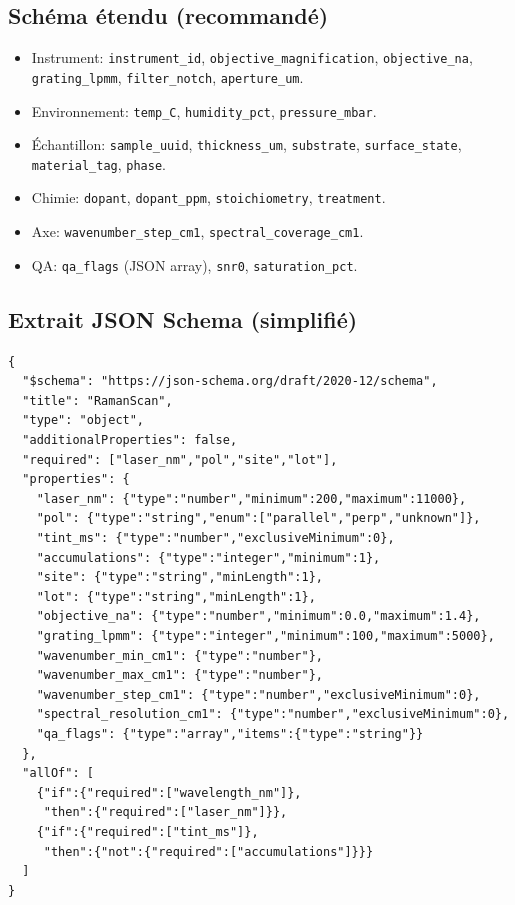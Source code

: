 \subsection{Schéma étendu (recommandé)}
\begin{itemize}[nosep]
\item Instrument: \texttt{instrument\_id}, \texttt{objective\_magnification}, \texttt{objective\_na}, \texttt{grating\_lpmm}, \texttt{filter\_notch}, \texttt{aperture\_um}.
\item Environnement: \texttt{temp\_C}, \texttt{humidity\_pct}, \texttt{pressure\_mbar}.
\item Échantillon: \texttt{sample\_uuid}, \texttt{thickness\_um}, \texttt{substrate}, \texttt{surface\_state}, \texttt{material\_tag}, \texttt{phase}.
\item Chimie: \texttt{dopant}, \texttt{dopant\_ppm}, \texttt{stoichiometry}, \texttt{treatment}.
\item Axe: \texttt{wavenumber\_step\_cm1}, \texttt{spectral\_coverage\_cm1}.
\item QA: \texttt{qa\_flags} (JSON array), \texttt{snr0}, \texttt{saturation\_pct}.
\end{itemize}

\subsection{Extrait JSON Schema (simplifié)}
\begin{lstlisting}[basicstyle=\ttfamily\small]
{
  "$schema": "https://json-schema.org/draft/2020-12/schema",
  "title": "RamanScan",
  "type": "object",
  "additionalProperties": false,
  "required": ["laser_nm","pol","site","lot"],
  "properties": {
    "laser_nm": {"type":"number","minimum":200,"maximum":11000},
    "pol": {"type":"string","enum":["parallel","perp","unknown"]},
    "tint_ms": {"type":"number","exclusiveMinimum":0},
    "accumulations": {"type":"integer","minimum":1},
    "site": {"type":"string","minLength":1},
    "lot": {"type":"string","minLength":1},
    "objective_na": {"type":"number","minimum":0.0,"maximum":1.4},
    "grating_lpmm": {"type":"integer","minimum":100,"maximum":5000},
    "wavenumber_min_cm1": {"type":"number"},
    "wavenumber_max_cm1": {"type":"number"},
    "wavenumber_step_cm1": {"type":"number","exclusiveMinimum":0},
    "spectral_resolution_cm1": {"type":"number","exclusiveMinimum":0},
    "qa_flags": {"type":"array","items":{"type":"string"}}
  },
  "allOf": [
    {"if":{"required":["wavelength_nm"]},
     "then":{"required":["laser_nm"]}},
    {"if":{"required":["tint_ms"]},
     "then":{"not":{"required":["accumulations"]}}}
  ]
}
\end{lstlisting}

